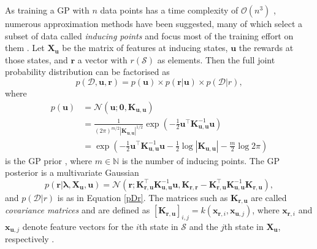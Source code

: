 \documentclass{mpaper}
\newcommand{\Kuu}{\mathbf{K}_{\mathbf{u},\mathbf{u}}}
\newcommand{\Krr}{\mathbf{K}_{\mathbf{r},\mathbf{r}}}
\newcommand{\Kru}{\mathbf{K}_{\mathbf{r},\mathbf{u}}}
\newcommand{\pfull}{p(\mathcal{D}, \mathbf{u}, \mathbf{r})}
\begin{document}
As training a GP with $n$ data points has a time complexity of
$\mathcal{O}(n^3)$ \cite{DBLP:books/lib/RasmussenW06}, numerous approximation
methods have been suggested, many of which select a subset of data called
\emph{inducing points} and focus most of the training effort on them
\cite{DBLP:journals/corr/abs-1807-01065}. Let $\mathbf{X_u}$ be the matrix of
features at inducing states, $\mathbf{u}$ the rewards at those states, and
$\mathbf{r}$ a vector with $r(\mathcal{S})$ as elements. Then the full joint
probability distribution can be factorised as
\[
  \pfull = p(\mathbf{u}) \times p(\mathbf{r} | \mathbf{u}) \times p(\mathcal{D} | r),
\]
where
\begin{align*}
  p(\mathbf{u}) &= \mathcal{N}(\mathbf{u}; \mathbf{0}, \Kuu) \\
                &= \frac{1}{(2\pi)^{m/2}|\Kuu|^{1/2}}\exp \left( -\frac{1}{2} \mathbf{u}^\intercal\Kuu^{-1}\mathbf{u} \right) \\
                &= \exp\left(-\frac{1}{2}\mathbf{u}^\intercal\Kuu^{-1}\mathbf{u} - \frac{1}{2}\log|\Kuu| - \frac{m}{2}\log 2\pi\right)
\end{align*}
is the GP prior \cite{DBLP:books/lib/RasmussenW06}, where $m \in \mathbb{N}$ is
the number of inducing points. The GP posterior is a
multivariate Gaussian \cite{DBLP:conf/nips/LevinePK11}
\begin{equation} \label{eq:r}
  p(\mathbf{r} | \bm\lambda, \mathbf{X_u}, \mathbf{u}) =
  \mathcal{N}(\mathbf{r}; \Kru^\intercal\Kuu^{-1}\mathbf{u}, \Krr - \Kru^\intercal\Kuu^{-1}\Kru),
\end{equation}
and $p(\mathcal{D} | r)$ is as in Equation \ref{pDr}. The matrices such as
$\Kru$ are called \emph{covariance matrices} and are defined as
$[\Kru]_{i,j} = k(\mathbf{x}_{\mathbf{r},i},
\mathbf{x}_{\mathbf{u},j})$, where $\mathbf{x}_{\mathbf{r},i}$ and
$\mathbf{x}_{\mathbf{u},j}$ denote feature vectors for the $i$th state in
$\mathcal{S}$ and the $j$th state in $\mathbf{X_u}$, respectively
\cite{DBLP:conf/uai/JinDAS17}.
\end{document}
